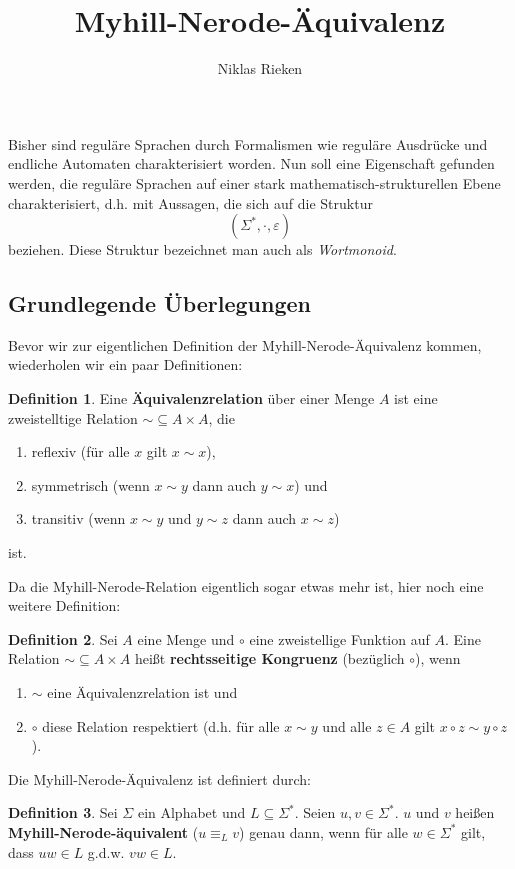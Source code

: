 \documentclass[11pt, a4paper]{article}
\author{Niklas Rieken}
\title{Myhill-Nerode-Äquivalenz}
\theoremstyle{definition}
\newtheorem{definition}{Definition}
\theoremstyle{plain}
\begin{document}
\maketitle

Bisher sind reguläre Sprachen durch Formalismen wie reguläre Ausdrücke und endliche Automaten charakterisiert worden. Nun soll eine Eigenschaft gefunden werden, die reguläre Sprachen auf einer stark mathematisch-struk\-tur\-ellen Ebene charakterisiert, d.h. mit Aussagen, die sich auf die Struktur
\[
	(\Sigma^\ast, \cdot, \varepsilon)
\]
beziehen. Diese Struktur bezeichnet man auch als \textit{Wortmonoid}.

\subsection*{Grundlegende Überlegungen}
Bevor wir zur eigentlichen Definition der Myhill-Nerode-Äquivalenz kommen, wiederholen wir ein paar Definitionen:
\begin{definition}
	Eine \textbf{Äquivalenzrelation} über einer Menge \( A \) ist eine zweistelltige Relation \( \sim \subseteq A \times A \), die 
	\begin{enumerate}
		\item reflexiv (für alle \( x \) gilt \( x \sim x \)),
		\item symmetrisch (wenn \( x \sim y \) dann auch \( y \sim  x \)) und
		\item transitiv (wenn \( x \sim y \) und \( y \sim z \) dann auch \( x \sim z \)) 
	\end{enumerate}
	ist.
\end{definition}

Da die Myhill-Nerode-Relation eigentlich sogar etwas mehr ist, hier noch eine weitere Definition:
\begin{definition}
	Sei \( A \) eine Menge und \( \circ \) eine zweistellige Funktion auf \( A \). Eine Relation \( \sim \subseteq A \times A \) heißt \textbf{rechtsseitige Kongruenz} (bezüglich \( \circ \)), wenn
	\begin{enumerate}
		\item \( \sim \) eine Äquivalenzrelation ist und
		\item \( \circ \) diese Relation respektiert (d.h. für alle \( x \sim y \) und alle \( z \in A \) gilt \( x \circ z \sim y \circ z \)).
	\end{enumerate}
\end{definition}

Die Myhill-Nerode-Äquivalenz ist definiert durch:
\begin{definition}
	Sei \( \Sigma \) ein Alphabet und \( L \subseteq \Sigma^\ast \). Seien \( u, v \in \Sigma^\ast \). \( u \) und \( v \) heißen \textbf{Myhill-Nerode-äquivalent} (\( u \equiv_L v \)) genau dann, wenn für alle \( w \in \Sigma^\ast \) gilt, dass \( uw \in L \) g.d.w. \( vw \in L \).
\end{definition}
\end{document}
